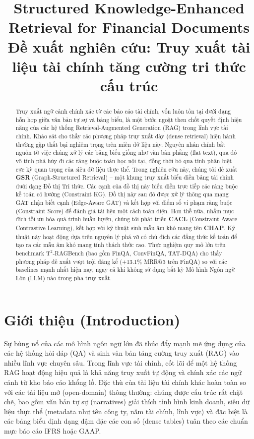 \documentclass[10pt, a4paper]{article}
\title{\LARGE\bfseries Structured Knowledge-Enhanced Retrieval for Financial Documents\\
\large Đề xuất nghiên cứu: Truy xuất tài liệu tài chính tăng cường tri thức cấu trúc}
\author{}
\date{}
\begin{document}
\maketitle

\vspace{-1.5cm}
\begin{abstract}
Truy xuất ngữ cảnh chính xác từ các báo cáo tài chính, vốn luôn tồn tại dưới dạng hỗn hợp giữa văn bản tự sự và bảng biểu, là một bước ngoặt then chốt quyết định hiệu năng của các hệ thống Retrieval-Augmented Generation (RAG) trong lĩnh vực tài chính. Khảo sát cho thấy các phương pháp truy xuất dày (dense retrieval) hiện hành thường gặp thất bại nghiêm trọng trên miền dữ liệu này. Nguyên nhân chính bắt nguồn từ việc chúng xử lý các bảng biểu giống như văn bản phẳng (flat text), qua đó vô tình phá hủy đi các ràng buộc toán học nội tại, đồng thời bỏ qua tính phân biệt cực kỳ quan trọng của siêu dữ liệu thực thể. Trong nghiên cứu này, chúng tôi đề xuất \textbf{GSR} (Graph-Structured Retrieval) -- một khung truy xuất biểu diễn bảng tài chính dưới dạng Đồ thị Tri thức. Các cạnh của đồ thị này biểu diễn trực tiếp các ràng buộc kế toán có hướng (Constraint KG). Đồ thị này sau đó được xử lý thông qua mạng GAT nhận biết cạnh (Edge-Aware GAT) và kết hợp với điểm số vi phạm ràng buộc (Constraint Score) để đánh giá tài liệu một cách toàn diện. Hơn thế nữa, nhằm mục đích tối ưu hóa quá trình huấn luyện, chúng tôi phát triển \textbf{CACL} (Constraint-Aware Contrastive Learning), kết hợp với kỹ thuật sinh mẫu âm khó mang tên \textbf{CHAP}. Kỹ thuật này hoạt động dựa trên nguyên lý phá vỡ có chủ đích các đẳng thức kế toán để tạo ra các mẫu âm khó mang tính thách thức cao. Thực nghiệm quy mô lớn trên benchmark $\mathrm{T}^2$-RAGBench (bao gồm FinQA, ConvFinQA, TAT-DQA) cho thấy phương pháp đề xuất vượt trội đáng kể (+13.1\% MRR@3 trên FinQA) so với các baselines mạnh nhất hiện nay, ngay cả khi không sử dụng bất kỳ Mô hình Ngôn ngữ Lớn (LLM) nào trong pha truy xuất.
\end{abstract}

\section{Giới thiệu (Introduction)}

Sự bùng nổ của các mô hình ngôn ngữ lớn đã thúc đẩy mạnh mẽ ứng dụng của các hệ thống hỏi đáp (QA) và sinh văn bản tăng cường truy xuất (RAG) vào nhiều lĩnh vực chuyên sâu. Trong lĩnh vực tài chính, cốt lõi để một hệ thống RAG hoạt động hiệu quả là khả năng truy xuất tự động và chính xác các ngữ cảnh từ kho báo cáo khổng lồ. Đặc thù của tài liệu tài chính khác hoàn toàn so với các tài liệu mở (open-domain) thông thường: chúng được cấu trúc rất chặt chẽ, bao gồm văn bản tự sự (narratives) giải thích tình hình kinh doanh, siêu dữ liệu thực thể (metadata như tên công ty, năm tài chính, lĩnh vực) và đặc biệt là các bảng biểu định dạng đậm đặc các con số (dense tables) tuân theo các chuẩn mực báo cáo IFRS hoặc GAAP.
\end{document}
